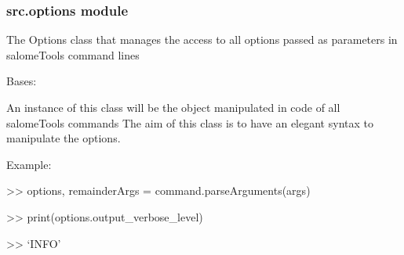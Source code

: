 \documentclass[a4paper,10pt,english]{sphinxmanual}
\begin{document}
\subsubsection{src.options module}
\label{\detokenize{commands/apidoc/src:module-src.options}}\label{\detokenize{commands/apidoc/src:src-options-module}}
The Options class that manages the access to all options passed as 
parameters in salomeTools command lines

\begin{fulllineitems}
\label{\detokenize{commands/apidoc/src:src.options.OptResult}}
Bases: 

An instance of this class will be the object manipulated
in code of all salomeTools commands
The aim of this class is to have an elegant syntax to manipulate the options.

\begin{DUlineblock}{0em}
\item[] Example:        
\item[] \textgreater{}\textgreater{} options, remainderArgs = command.parseArguments(args)
\item[] \textgreater{}\textgreater{} print(options.output\_verbose\_level)
\item[] \textgreater{}\textgreater{} ‘INFO’
\end{DUlineblock}

\end{fulllineitems}

\end{document}
